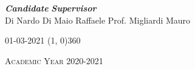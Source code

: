 \begin{titlepage}
\vfill
\begin{normalsize}
\begin{flushleft}
  \hspace{62pt} \textbf{\textit{Candidate}} \hspace{130pt} \textbf{\textit{Supervisor}}\\
  \vspace{5pt}
  \hspace{27pt} {Di Nardo Di Maio Raffaele} \hspace{65pt} {Prof. Migliardi Mauro}\\
\end{flushleft}
\end{normalsize}

\vfill
\begin{center}
\textsc{01-03-2021}
\hspace{-0.2cm}
\line(1, 0){360}

\textsc{Academic Year 2020-2021}
\end{center}
\end{titlepage}
\cleardoublepage %
\thispagestyle{empty}